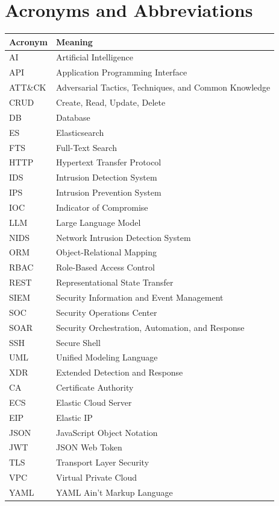 \chapter*{Acronyms and Abbreviations}

\begin{longtable}{@{}p{}p{}@{}}
\toprule
\textbf{Acronym} & \textbf{Meaning} \\
\midrule
AI & Artificial Intelligence \\
API & Application Programming Interface \\
ATT\&CK & Adversarial Tactics, Techniques, and Common Knowledge \\
CRUD & Create, Read, Update, Delete \\
DB & Database \\
ES & Elasticsearch \\
FTS & Full-Text Search \\
HTTP & Hypertext Transfer Protocol \\
IDS & Intrusion Detection System \\
IPS & Intrusion Prevention System \\
IOC & Indicator of Compromise \\
LLM & Large Language Model \\
NIDS & Network Intrusion Detection System \\
ORM & Object-Relational Mapping \\
RBAC & Role-Based Access Control \\
REST & Representational State Transfer \\
SIEM & Security Information and Event Management \\
SOC & Security Operations Center \\
SOAR & Security Orchestration, Automation, and Response \\
SSH & Secure Shell \\
UML & Unified Modeling Language \\
XDR & Extended Detection and Response \\
CA & Certificate Authority \\
ECS & Elastic Cloud Server \\
EIP & Elastic IP \\
JSON & JavaScript Object Notation \\
JWT & JSON Web Token \\
TLS & Transport Layer Security \\
VPC & Virtual Private Cloud \\
YAML & YAML Ain't Markup Language \\
\bottomrule
\end{longtable}

